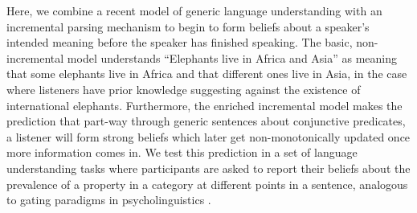 \documentclass[10pt,letterpaper]{article}
\begin{document}
Here, we combine a recent model of generic language understanding  \cite{Tessler2019:genLang} with an incremental parsing mechanism to begin to form beliefs about a speaker's intended meaning before the speaker has finished speaking.
The basic, non-incremental model understands ``Elephants live in Africa and Asia” as meaning that some elephants live in Africa and that different ones live in Asia, in the case where listeners have prior knowledge suggesting against the existence of international elephants.
Furthermore, the enriched incremental model makes the prediction that part-way through generic sentences about conjunctive predicates, a listener will form strong beliefs which later get non-monotonically updated once more information comes in.
We test this prediction in a set of language understanding tasks where participants are asked to report their beliefs about the prevalence of a property in a category at different points in a sentence, analogous to gating paradigms in psycholinguistics \cite{Grosjean1980}.








\end{document}
